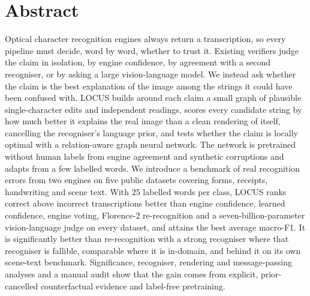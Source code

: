 \section*{Abstract}
Optical character recognition engines always return a transcription, so every pipeline must decide, word by word,
whether to trust it. Existing verifiers judge the claim in isolation, by
engine confidence, by agreement with a second recogniser, or by asking a large vision-language model. We instead ask
whether the claim is the best explanation of the image among the strings it could have been confused with. LOCUS builds around each claim a small graph of plausible single-character edits and independent
readings, scores every candidate string by how much better it explains the real image than a clean rendering of
itself, cancelling the recogniser's language prior, and tests whether the claim is locally optimal with a
relation-aware graph neural network. The network is pretrained without human labels from engine agreement and
synthetic corruptions and adapts from a few labelled words. We introduce a benchmark of real recognition errors from
two engines on five public datasets covering forms, receipts, handwriting and scene text. With 25 labelled words per
class, LOCUS ranks correct above incorrect transcriptions better than engine confidence, learned confidence, engine
voting, Florence-2 re-recognition and a seven-billion-parameter vision-language judge on every dataset, and attains
the best average macro-F1. It is significantly better than re-recognition with a strong recogniser
where that recogniser is fallible, comparable where it is in-domain, and behind it on its own scene-text benchmark.
Significance, recogniser, rendering and message-passing analyses and a manual audit show that the gain comes from explicit, prior-cancelled counterfactual evidence and label-free pretraining.
\vspace{5pt}
